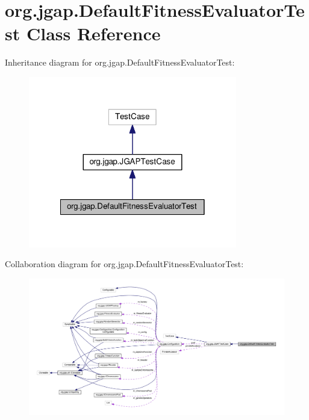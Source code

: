 \hypertarget{classorg_1_1jgap_1_1_default_fitness_evaluator_test}{\section{org.\-jgap.\-Default\-Fitness\-Evaluator\-Test Class Reference}
\label{classorg_1_1jgap_1_1_default_fitness_evaluator_test}
}


Inheritance diagram for org.\-jgap.\-Default\-Fitness\-Evaluator\-Test\-:
\nopagebreak
\begin{figure}[H]
\begin{center}
\leavevmode
\includegraphics[width=258pt]{classorg_1_1jgap_1_1_default_fitness_evaluator_test__inherit__graph}
\end{center}
\end{figure}


Collaboration diagram for org.\-jgap.\-Default\-Fitness\-Evaluator\-Test\-:
\nopagebreak
\begin{figure}[H]
\begin{center}
\leavevmode
\includegraphics[width=350pt]{classorg_1_1jgap_1_1_default_fitness_evaluator_test__coll__graph}
\end{center}
\end{figure}
